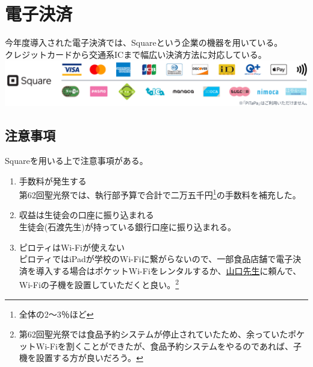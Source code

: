 \documentclass[dvipdfmx,jb5]{jreport}
\newcommand{\mail}[2]{\href{mailto:#2}{#1}}
\begin{document}
\section{電子決済}\label{sec:電子決済}
今年度導入された電子決済では、Squareという企業の機器を用いている。\\
クレジットカードから交通系ICまで幅広い決済方法に対応している。\\
\includegraphics[scale=0.15]{assets/square_availability.png}
\subsection{注意事項}
Squareを用いる上で注意事項がある。
\begin{enumerate}[注意1]
      \item 手数料が発生する\\
            第62回聖光祭では、執行部予算で合計で二万五千円\footnote{全体の2〜3％ほど}の手数料を補充した。
      \item 収益は生徒会の口座に振り込まれる\\
            生徒会(石渡先生)が持っている銀行口座に振り込まれる。
      \item ピロティはWi-Fiが使えない\\
            ピロティではiPadが学校のWi-Fiに繋がらないので、一部食品店舗で電子決済を導入する場合はポケットWi-Fiをレンタルするか、\mail{山口先生}{yuri.ayamguchi@seiko.ac.jp}に頼んで、Wi-Fiの子機を設置していただくと良い。\footnote{第62回聖光祭では食品予約システムが停止されていたため、余っていたポケットWi-Fiを割くことができたが、食品予約システムをやるのであれば、子機を設置する方が良いだろう。}
\end{enumerate}
\end{document}
